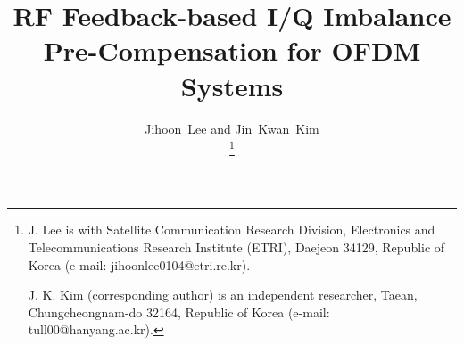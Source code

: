 \documentclass[lettersize,journal]{IEEEtran}
\begin{document}
\title{RF Feedback-based I/Q Imbalance Pre-Compensation for OFDM Systems}

\author{Jihoon~Lee and Jin~Kwan~Kim%

\thanks{
J. Lee is with Satellite Communication Research Division, Electronics and Telecommunications Research Institute (ETRI), Daejeon 34129, Republic of Korea (e-mail: jihoonlee0104@etri.re.kr).

J. K. Kim (corresponding author) is an independent researcher, Taean, Chungcheongnam-do 32164, Republic of Korea (e-mail: tull00@hanyang.ac.kr).
}

}



\maketitle
\end{document}
